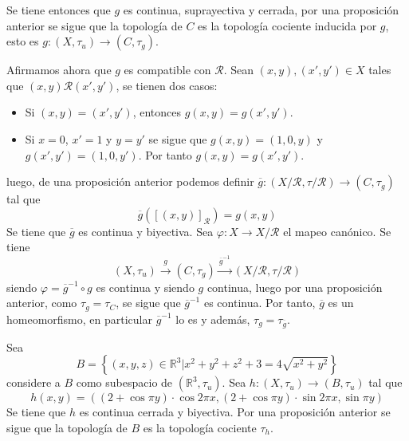 \documentclass[12pt]{report}
\theoremstyle{largebreak}
\newcommand\cf[3]{\ensuremath{#1:#2\rightarrow#3}}
\begin{document}
\begin{exa}
        Se tiene entonces que $g$ es continua, suprayectiva y cerrada, por una proposición anterior se sigue que la topología de $C$ es la topología cociente inducida por $g$, esto es $\cf{g}{(X,\tau_u)}{(C,\tau_g)}$.

        Afirmamos ahora que $g$ es compatible con $\mathcal{R}$. Sean $(x,y),(x',y')\in X$ tales que $(x,y)\mathcal{R}(x',y')$, se tienen dos casos:
        \begin{itemize}
            \item Si $(x,y)=(x',y')$, entonces $g(x,y)=g(x',y')$.
            \item Si $x=0$, $x'=1$ y $y=y'$ se sigue que $g(x,y)=(1,0,y)$ y $g(x',y')=(1,0,y')$. Por tanto $g(x,y)=g(x',y')$.
        \end{itemize}
        luego, de una proposición anterior podemos definir $\cf{\overline{g}}{(X/\mathcal{R},\tau/\mathcal{R})}{(C,\tau_g)}$ tal que
        \begin{equation*}
            \overline{g}([(x,y)]_{\mathcal{R}})=g(x,y)
        \end{equation*}
        Se tiene que $\overline{g}$ es continua y biyectiva. Sea $\cf{\varphi}{X}{X/\mathcal{R}}$ el mapeo canónico. Se tiene
        \begin{equation*}
            (X,\tau_u)\overset{g}{\longrightarrow}(C,\tau_g)\overset{\overline{g}^{-1}}{\longrightarrow}(X/\mathcal{R},\tau/\mathcal{R})
        \end{equation*}
        siendo $\varphi=\overline{g}^{-1}\circ g$ es continua y siendo $g$ continua, luego por una proposición anterior, como $\tau_g=\tau_C$, se sigue que $\overline{g}^{-1}$ es continua. Por tanto, $\overline{g}$ es un homeomorfismo, en particular $\overline{g}^{-1}$ lo es y además, $\tau_g=\tau_{\overline{g}}$.

        Sea
        \begin{equation*}
            B=\left\{(x,y,z)\in\mathbb{R}^3\Big|x^2+y^2+z^2+3=4\sqrt{x^2+y^2} \right\}
        \end{equation*}
        considere a $B$ como subespacio de $(\mathbb{R}^3,\tau_u)$. Sea $\cf{h}{(X,\tau_u)}{(B,\tau_u)}$ tal que
        \begin{equation*}
            h(x,y)=((2+\cos\pi y)\cdot\cos 2\pi x,(2+\cos \pi y)\cdot\sin 2\pi x,\sin \pi y)
        \end{equation*}
        Se tiene que $h$ es continua cerrada y biyectiva. Por una proposición anterior se sigue que la topología de $B$ es la topología cociente $\tau_h$.


\end{exa}
\end{document}
